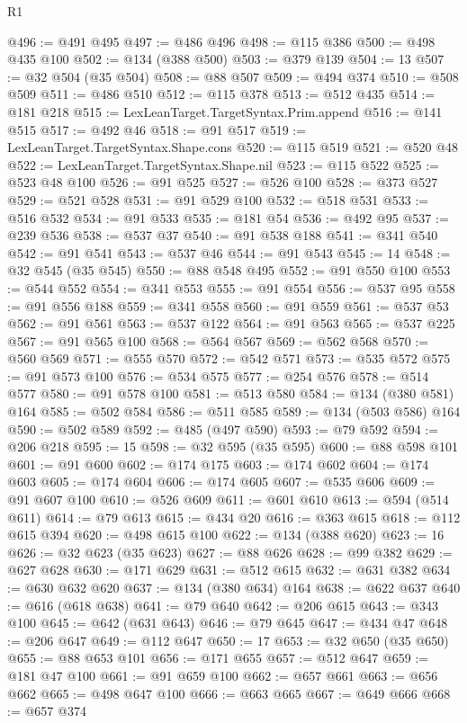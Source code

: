 \begin{lexlean}{R1}
\begin{coremodule}
@496 := @491 @495
@497 := @486 @496
@498 := @115 @386
@500 := @498 @435 @100
@502 := @134 (@388 @500)
@503 := @379 @139
@504 := 13
@507 := @32 @504 (@35 @504)
@508 := @88 @507
@509 := @494 @374
@510 := @508 @509
@511 := @486 @510
@512 := @115 @378
@513 := @512 @435
@514 := @181 @218
@515 := LexLeanTarget.TargetSyntax.Prim.append
@516 := @141 @515
@517 := @492 @46
@518 := @91 @517
@519 := LexLeanTarget.TargetSyntax.Shape.cons
@520 := @115 @519
@521 := @520 @48
@522 := LexLeanTarget.TargetSyntax.Shape.nil
@523 := @115 @522
@525 := @523 @48 @100
@526 := @91 @525
@527 := @526 @100
@528 := @373 @527
@529 := @521 @528
@531 := @91 @529 @100
@532 := @518 @531
@533 := @516 @532
@534 := @91 @533
@535 := @181 @54
@536 := @492 @95
@537 := @239 @536
@538 := @537 @37
@540 := @91 @538 @188
@541 := @341 @540
@542 := @91 @541
@543 := @537 @46
@544 := @91 @543
@545 := 14
@548 := @32 @545 (@35 @545)
@550 := @88 @548 @495
@552 := @91 @550 @100
@553 := @544 @552
@554 := @341 @553
@555 := @91 @554
@556 := @537 @95
@558 := @91 @556 @188
@559 := @341 @558
@560 := @91 @559
@561 := @537 @53
@562 := @91 @561
@563 := @537 @122
@564 := @91 @563
@565 := @537 @225
@567 := @91 @565 @100
@568 := @564 @567
@569 := @562 @568
@570 := @560 @569
@571 := @555 @570
@572 := @542 @571
@573 := @535 @572
@575 := @91 @573 @100
@576 := @534 @575
@577 := @254 @576
@578 := @514 @577
@580 := @91 @578 @100
@581 := @513 @580
@584 := @134 (@380 @581) @164
@585 := @502 @584
@586 := @511 @585
@589 := @134 (@503 @586) @164
@590 := @502 @589
@592 := @485 (@497 @590)
@593 := @79 @592
@594 := @206 @218
@595 := 15
@598 := @32 @595 (@35 @595)
@600 := @88 @598 @101
@601 := @91 @600
@602 := @174 @175
@603 := @174 @602
@604 := @174 @603
@605 := @174 @604
@606 := @174 @605
@607 := @535 @606
@609 := @91 @607 @100
@610 := @526 @609
@611 := @601 @610
@613 := @594 (@514 @611)
@614 := @79 @613
@615 := @434 @20
@616 := @363 @615
@618 := @112 @615 @394
@620 := @498 @615 @100
@622 := @134 (@388 @620)
@623 := 16
@626 := @32 @623 (@35 @623)
@627 := @88 @626
@628 := @99 @382
@629 := @627 @628
@630 := @171 @629
@631 := @512 @615
@632 := @631 @382
@634 := @630 @632 @620
@637 := @134 (@380 @634) @164
@638 := @622 @637
@640 := @616 (@618 @638)
@641 := @79 @640
@642 := @206 @615
@643 := @343 @100
@645 := @642 (@631 @643)
@646 := @79 @645
@647 := @434 @47
@648 := @206 @647
@649 := @112 @647
@650 := 17
@653 := @32 @650 (@35 @650)
@655 := @88 @653 @101
@656 := @171 @655
@657 := @512 @647
@659 := @181 @47 @100
@661 := @91 @659 @100
@662 := @657 @661
@663 := @656 @662
@665 := @498 @647 @100
@666 := @663 @665
@667 := @649 @666
@668 := @657 @374

\end{coremodule}
\end{lexlean}
